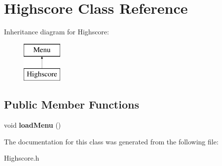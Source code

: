\hypertarget{class_highscore}{}\section{Highscore Class Reference}
\label{class_highscore}
Inheritance diagram for Highscore\+:\begin{figure}[H]
\begin{center}
\leavevmode
\includegraphics[height=2.000000cm]{class_highscore}
\end{center}
\end{figure}
\subsection*{Public Member Functions}
\begin{DoxyCompactItemize}
\item 
\hypertarget{class_highscore_ab237fca14b8c4adeec1bb0ee1d3e1dc1}{}void {\bfseries load\+Menu} ()\label{class_highscore_ab237fca14b8c4adeec1bb0ee1d3e1dc1}

\end{DoxyCompactItemize}


The documentation for this class was generated from the following file\+:\begin{DoxyCompactItemize}
\item 
Highscore.\+h\end{DoxyCompactItemize}
